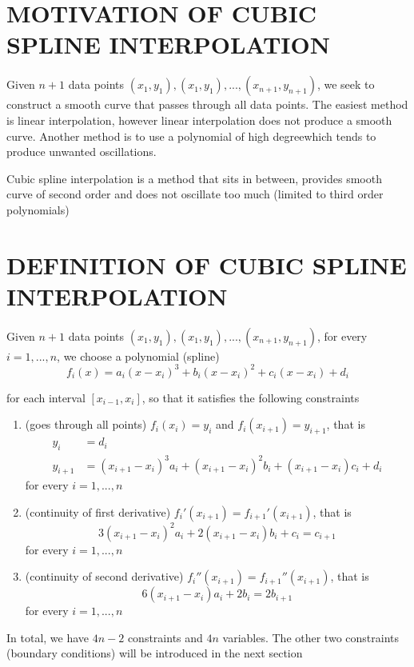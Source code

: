 \section{MOTIVATION OF CUBIC SPLINE INTERPOLATION}

Given $n+1$ data points $(x_1, y_1), (x_1, y_1), ..., (x_{n+1}, y_{n+1})$, we seek to construct a smooth curve that passes through all data points. The easiest method is linear interpolation, however linear interpolation does not produce a smooth curve. Another method is to use a polynomial of high degreewhich tends to produce unwanted oscillations.

Cubic spline interpolation is a method that sits in between, provides smooth curve of second order and does not oscillate too much (limited to third order polynomials)

\section{DEFINITION OF CUBIC SPLINE INTERPOLATION}

Given $n+1$ data points $(x_1, y_1), (x_1, y_1), ..., (x_{n+1}, y_{n+1})$, for every $i = 1, ..., n$, we choose a polynomial (spline)
$$
	f_i(x) = a_i (x - x_i)^3 + b_i (x - x_i)^2 + c_i (x - x_i) + d_i
$$

for each interval $[x_{i-1}, x_i]$, so that it satisfies the following constraints
\begin{enumerate}
	\item (goes through all points) $f_i(x_i) = y_i$ and $f_i(x_{i+1}) = y_{i+1}$, that is
	\begin{align*}
		y_i  &= d_i\\
		y_{i+1} &= (x_{i+1} - x_i)^3 a_i + (x_{i+1} - x_i)^2 b_i + (x_{i+1} - x_i) c_i + d_i
	\end{align*}
	for every $i = 1, ..., n$
	
	\item (continuity of first derivative) $f_i'(x_{i+1}) = f_{i+1}'(x_{i+1})$, that is
	$$
		3 (x_{i+1} - x_i)^2 a_i + 2 (x_{i+1} - x_i) b_i + c_i = c_{i+1} 
	$$
	for every $i = 1, ..., n$
	
	\item (continuity of second derivative) $f_i''(x_{i+1}) = f_{i+1}''(x_{i+1})$, that is
	$$
		6 (x_{i+1} - x_i) a_i + 2 b_i = 2 b_{i+1}
	$$
	for every $i = 1, ..., n$
\end{enumerate}

In total, we have $4n-2$ constraints and $4n$ variables. The other two constraints (boundary conditions) will be introduced in the next section 

